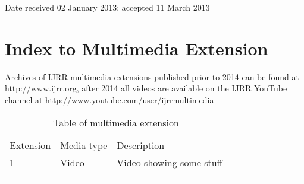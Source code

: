 \begin{footnotesize}
\noindent Date received 02 January 2013; accepted 11 March 2013\\
\end{footnotesize}

\maketitle

\let\thefootnote\relax{}

\author{Aaron~M~Johnson$^{1}$, Samuel~A~Burden$^{2}$ and Daniel~E~Koditschek$^{3}$\\
{\small $^{1}$Department of Mathematics, University of Mazandaran, Iran}\\
{\small $^{2}$Department of Mathematical Sciences, University of South Africa, South Africa}\\ 
{\small$^{3}$Department of Mathematics and Computer Science, \c{C}ankaya University, Turkey}\\
}
\date{}
\maketitle
\let\thefootnote\relax{}

\appendix
\renewcommand{\thesection}{\arabic{section}}

\section{Index to Multimedia Extension}
Archives of IJRR multimedia extensions published prior to 2014 can be found at 
http://www.ijrr.org, after 2014 all videos are available on the IJRR YouTube channel 
at http://www.youtube.com/user/ijrrmultimedia
\begin{table}
\centering
\caption*{Table of multimedia extension}
\begin{tabular}{lll}
Extension & Media type & Description              \\
1         & Video      & Video showing some stuff \\
          &            &                          \\
          &            &                         
\end{tabular}
\end{table}

